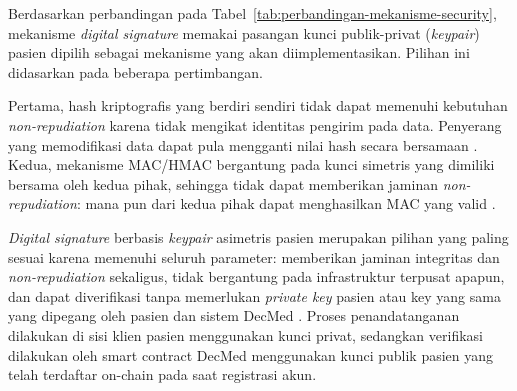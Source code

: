 Berdasarkan perbandingan pada Tabel~\ref{tab:perbandingan-mekanisme-security}, mekanisme \textit{digital signature} memakai pasangan kunci publik-privat (\textit{keypair}) pasien dipilih sebagai mekanisme yang akan diimplementasikan. %
Pilihan ini didasarkan pada beberapa pertimbangan.

Pertama, hash kriptografis yang berdiri sendiri tidak dapat memenuhi kebutuhan \textit{non-repudiation} karena tidak mengikat identitas pengirim pada data.
Penyerang yang memodifikasi data dapat pula mengganti nilai hash secara bersamaan \parencite{banerjee2025blockchain}. 
Kedua, mekanisme MAC/HMAC bergantung pada kunci simetris yang dimiliki bersama oleh kedua pihak, sehingga tidak dapat memberikan jaminan \textit{non-repudiation}: mana pun dari kedua pihak dapat menghasilkan MAC yang valid \parencite{NIST_glossary_nonrepudiation}.

\textit{Digital signature} berbasis \textit{keypair} asimetris pasien merupakan pilihan yang paling sesuai karena memenuhi seluruh parameter: memberikan jaminan integritas dan \textit{non-repudiation} sekaligus, tidak bergantung pada infrastruktur terpusat apapun, dan dapat diverifikasi tanpa memerlukan \textit{private key} pasien atau key yang sama yang dipegang oleh pasien dan sistem DecMed \parencite{NIST_FIPS186-5, lei2023analysis, banerjee2025blockchain}. 
Proses penandatanganan dilakukan di sisi klien pasien menggunakan kunci privat, sedangkan verifikasi dilakukan oleh smart contract DecMed menggunakan kunci publik pasien yang telah terdaftar on-chain pada saat registrasi akun.